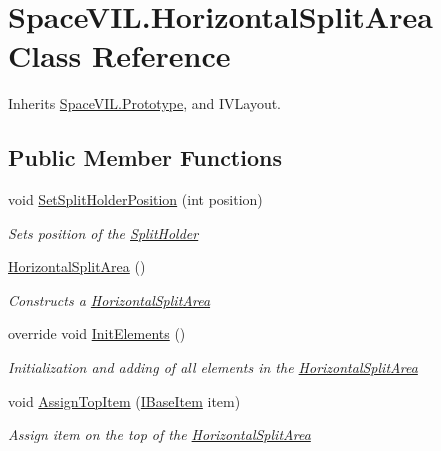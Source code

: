 \hypertarget{class_space_v_i_l_1_1_horizontal_split_area}{}\section{Space\+V\+I\+L.\+Horizontal\+Split\+Area Class Reference}
\label{class_space_v_i_l_1_1_horizontal_split_area}


Inherits \mbox{\hyperlink{class_space_v_i_l_1_1_prototype}{Space\+V\+I\+L.\+Prototype}}, and I\+V\+Layout.

\subsection*{Public Member Functions}
\begin{DoxyCompactItemize}
\item 
void \mbox{\hyperlink{class_space_v_i_l_1_1_horizontal_split_area_a0e39ace0e53c5ec509c7b40168b025ae}{Set\+Split\+Holder\+Position}} (int position)
\begin{DoxyCompactList}\small\item\em Sets position of the \mbox{\hyperlink{class_space_v_i_l_1_1_split_holder}{Split\+Holder}} \end{DoxyCompactList}\item 
\mbox{\hyperlink{class_space_v_i_l_1_1_horizontal_split_area_ab2db170cc4803f8f92b1f54e40ccf33e}{Horizontal\+Split\+Area}} ()
\begin{DoxyCompactList}\small\item\em Constructs a \mbox{\hyperlink{class_space_v_i_l_1_1_horizontal_split_area}{Horizontal\+Split\+Area}} \end{DoxyCompactList}\item 
override void \mbox{\hyperlink{class_space_v_i_l_1_1_horizontal_split_area_ac977d45d7056f67bbd353877ff204df9}{Init\+Elements}} ()
\begin{DoxyCompactList}\small\item\em Initialization and adding of all elements in the \mbox{\hyperlink{class_space_v_i_l_1_1_horizontal_split_area}{Horizontal\+Split\+Area}} \end{DoxyCompactList}\item 
void \mbox{\hyperlink{class_space_v_i_l_1_1_horizontal_split_area_aecce1e6d987c61a20f1ae41513becefc}{Assign\+Top\+Item}} (\mbox{\hyperlink{interface_space_v_i_l_1_1_core_1_1_i_base_item}{I\+Base\+Item}} item)
\begin{DoxyCompactList}\small\item\em Assign item on the top of the \mbox{\hyperlink{class_space_v_i_l_1_1_horizontal_split_area}{Horizontal\+Split\+Area}} \end{DoxyCompactList}\item 

\end{DoxyCompactItemize}
